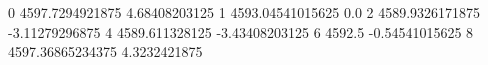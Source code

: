 0 4597.7294921875 4.68408203125
1 4593.04541015625 0.0
2 4589.9326171875 -3.11279296875
4 4589.611328125 -3.43408203125
6 4592.5 -0.54541015625
8 4597.36865234375 4.3232421875
